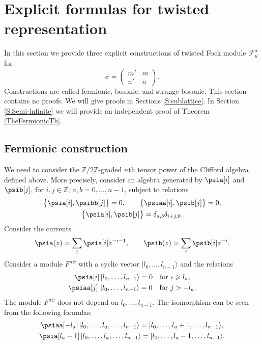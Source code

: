 \section{Explicit formulas for twisted representation} \label{Section with answers}
In this section we provide three explicit constructions of twisted Fock module $\mathcal{F}^\sigma_u$ for
\begin{equation} \label{sigma}
\sigma = \begin{pmatrix}m' & m \\
n' & n
\end{pmatrix}.
\end{equation}
Constructions are called fermionic, bosonic, and strange bosonic. This section contains no proofs. We will give proofs in Sections \ref{S:sublattice}. In Section \ref{S:Semi-infinite} we will provide an independent proof of Theorem \ref{TheFermionicTh}.

\subsection{Fermionic construction} \label{section: The Fermionic Th}

We need to consider the $\mathbb{Z}/2 \mathbb{Z}$-graded $n$th tensor power of the Clifford algebra defined above. More precisely, consider an algebra generated by $\psia [i]$ and $\psib [j]$, for $i,j \in \mathbb{Z}$; $a,b=0, \dots , n-1$, subject to relations
\begin{gather} \label{eq:nClifford1}
\big\{ \psia[i], \psibb[j] \big\} =0, \qquad \big\{ \psiaa [i], \psib[j] \big\} =0, \\ \big\{ \psia [i] , \psib [j] \big\} = \delta_{a,b} \delta_{i+j, 0}. \label{eq:nClifford2}
\end{gather}
Consider the currents
\begin{gather*}
\psia (z) = \sum_{i} \psia [i] z^{-i-1}, \qquad \psib(z) = \sum_i \psib[i] z^{-i}. \label{eq:nFermions}
\end{gather*}
Consider a module $F^{n\psi}$ with a cyclic vector $|l_0, \dots, l_{n-1} \rangle$ and the relations
\begin{gather*}
\psia [i] \, |l_0, \dots, l_{n-1} \rangle = 0 \quad \text{for } i \geqslant l_a, \\ \psiaa [j] \, \left|l_0, \dots, l_{n-1} \right\rangle = 0 \quad \text{for } j > -l_a.
\end{gather*}
The module $F^{n\psi}$ does not depend on $l_0, \dots, l_{n-1}$. The isomorphism can be seen from the following formulas:
\begin{gather*}
\psiaa [ -l_a ] \, |l_0, \dots, l_a, \dots, l_{n-1} \rangle = | l_0, \dots, l_a+1, \dots , l_{n-1} \rangle, \\
\psia [ l_a-1 ] \, |l_0, \dots, l_a, \dots , l_{n-1} \rangle = |l_0, \dots, l_a-1, \dots , l_{n-1} \rangle.
\end{gather*}

